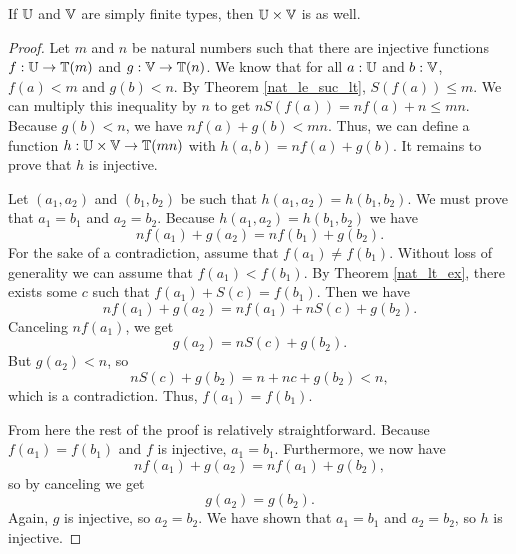 \documentclass[../../math.tex]{subfiles}
\begin{document}
\begin{theorem} \label{simple_finite_prod}
    If $\mathbb{U}$ and $\mathbb{V}$ are simply finite types, then $\mathbb{U} \times \mathbb{V}$ is as well.
\end{theorem}
\begin{proof}
    Let $m$ and $n$ be natural numbers such that there are injective functions
    $f : \mathbb{U} \to \mathbb{T}(m)$ and $g : \mathbb{V} \to \mathbb{T}(n)$.  We know that for all $a : \mathbb{U}$
    and $b : \mathbb{V}$, $f(a) < m$ and $g(b) < n$.  By Theorem \ref{nat_le_suc_lt},
    $S(f(a)) \leq m$.  We can multiply this inequality by $n$ to get $nS(f(a)) =
    nf(a) + n \leq mn$.  Because $g(b) < n$, we have $nf(a) + g(b) < mn$.  Thus,
    we can define a function $h : \mathbb{U} \times \mathbb{V} \to \mathbb{T}(mn)$ with $h(a, b) = nf(a)
    + g(b)$.  It remains to prove that $h$ is injective.

    Let $(a_1, a_2)$ and $(b_1, b_2)$ be such that $h(a_1, a_2) = h(b_1, b_2)$.
    We must prove that $a_1 = b_1$ and $a_2 = b_2$.  Because $h(a_1, a_2) =
    h(b_1, b_2)$ we have
    \[
        nf(a_1) + g(a_2) = nf(b_1) + g(b_2).
    \]
    For the sake of a contradiction, assume that $f(a_1) \neq f(b_1)$.  Without
    loss of generality we can assume that $f(a_1) < f(b_1)$.  By Theorem
    \ref{nat_lt_ex}, there exists some $c$ such that $f(a_1) + S(c) = f(b_1)$.
    Then we have
    \[
        nf(a_1) + g(a_2) = nf(a_1) + nS(c) + g(b_2).
    \]
    Canceling $nf(a_1)$, we get
    \[
        g(a_2) = nS(c) + g(b_2).
    \]
    But $g(a_2) < n$, so
    \[
        nS(c) + g(b_2) = n + nc + g(b_2) < n,
    \]
    which is a contradiction.  Thus, $f(a_1) = f(b_1)$.

    From here the rest of the proof is relatively straightforward.  Because
    $f(a_1) = f(b_1)$ and $f$ is injective, $a_1 = b_1$.  Furthermore, we now
    have
    \[
        nf(a_1) + g(a_2) = nf(a_1) + g(b_2),
    \]
    so by canceling we get
    \[
        g(a_2) = g(b_2).
    \]
    Again, $g$ is injective, so $a_2 = b_2$.  We have shown that $a_1 = b_1$ and
    $a_2 = b_2$, so $h$ is injective.
\end{proof}
\end{document}
